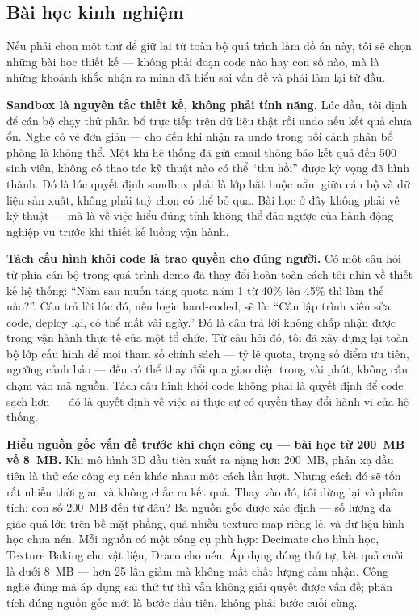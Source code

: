 \documentclass[../DoAn.tex]{subfiles}
\begin{document}
\subsection{Bài học kinh nghiệm}
\label{subsection:6.1.4}

Nếu phải chọn một thứ để giữ lại từ toàn bộ quá trình làm đồ án này, tôi sẽ
chọn những bài học thiết kế --- không phải đoạn code nào hay con số nào, mà là
những khoảnh khắc nhận ra mình đã hiểu sai vấn đề và phải làm lại từ đầu.

\textbf{Sandbox là nguyên tắc thiết kế, không phải tính năng.} Lúc đầu, tôi
định để cán bộ chạy thử phân bổ trực tiếp trên dữ liệu thật rồi undo nếu kết
quả chưa ổn. Nghe có vẻ đơn giản --- cho đến khi nhận ra undo trong bối cảnh
phân bổ phòng là không thể. Một khi hệ thống đã gửi email thông báo kết quả
đến 500 sinh viên, không có thao tác kỹ thuật nào có thể ``thu hồi'' được kỳ
vọng đã hình thành. Đó là lúc quyết định sandbox phải là lớp bắt buộc nằm giữa
cán bộ và dữ liệu sản xuất, không phải tuỳ chọn có thể bỏ qua. Bài học ở đây
không phải về kỹ thuật --- mà là về việc hiểu đúng tính không thể đảo ngược
của hành động nghiệp vụ trước khi thiết kế luồng vận hành.

\textbf{Tách cấu hình khỏi code là trao quyền cho đúng người.} Có một câu hỏi
từ phía cán bộ trong quá trình demo đã thay đổi hoàn toàn cách tôi nhìn về thiết
kế hệ thống: ``Năm sau muốn tăng quota năm 1 từ 40\% lên 45\% thì làm thế
nào?''. Câu trả lời lúc đó, nếu logic hard-coded, sẽ là: ``Cần lập trình viên
sửa code, deploy lại, có thể mất vài ngày.'' Đó là câu trả lời không chấp nhận
được trong vận hành thực tế của một tổ chức. Từ câu hỏi đó, tôi đã xây dựng
lại toàn bộ lớp cấu hình để mọi tham số chính sách --- tỷ lệ quota, trọng số
điểm ưu tiên, ngưỡng cảnh báo --- đều có thể thay đổi qua giao diện trong vài
phút, không cần chạm vào mã nguồn. Tách cấu hình khỏi code không phải là quyết
định để code sạch hơn --- đó là quyết định về việc ai thực sự có quyền thay đổi
hành vi của hệ thống.

\textbf{Hiểu nguồn gốc vấn đề trước khi chọn công cụ --- bài học từ 200~MB về
8~MB.} Khi mô hình 3D đầu tiên xuất ra nặng hơn 200~MB, phản xạ đầu tiên là
thử các công cụ nén khác nhau một cách lần lượt. Nhưng cách đó sẽ tốn rất nhiều
thời gian và không chắc ra kết quả. Thay vào đó, tôi dừng lại và phân tích: con
số 200~MB đến từ đâu? Ba nguồn gốc được xác định --- số lượng đa giác quá lớn
trên bề mặt phẳng, quá nhiều texture map riêng lẻ, và dữ liệu hình học chưa
nén. Mỗi nguồn có một công cụ phù hợp: Decimate cho hình học, Texture Baking
cho vật liệu, Draco cho nén. Áp dụng đúng thứ tự, kết quả cuối là dưới 8~MB ---
hơn 25 lần giảm mà không mất chất lượng cảm nhận. Công nghệ đúng mà áp dụng
sai thứ tự thì vẫn không giải quyết được vấn đề; phân tích đúng nguồn gốc mới
là bước đầu tiên, không phải bước cuối cùng.
\end{document}
